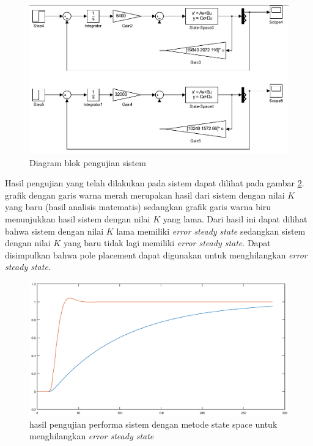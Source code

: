 \documentclass[../main.tex]{subfiles}
\begin{document}
            \begin{figure}[H]
                \centering
                \includegraphics[width = \textwidth]{assets/image/simulink_homework_2.png}
                \caption{Diagram blok pengujian sistem}
                \label{gambar_3}
            \end{figure}
            Hasil pengujian yang telah dilakukan pada sistem dapat dilihat pada gambar \ref{gambar_4}. grafik dengan garis warna merah merupakan hasil dari sistem dengan nilai $K$ yang baru (hasil analisis matematis) sedangkan grafik garis warna biru menunjukkan hasil sistem dengan nilai $K$ yang lama. Dari hasil ini dapat dilihat bahwa sistem dengan nilai $K$ lama memiliki \textit{error steady state} sedangkan sistem dengan nilai $K$ yang baru tidak lagi memiliki \textit{error steady state}. Dapat disimpulkan bahwa pole placement dapat digunakan untuk menghilangkan \textit{error steady state}.
            \begin{figure}[H]
                \centering
                \includegraphics[width = \textwidth]{assets/image/Homework_2.eps}
                \caption{hasil pengujian performa sistem dengan metode state space untuk menghilangkan \textit{error steady state}}
                \label{gambar_4}
            \end{figure}
\end{document}
